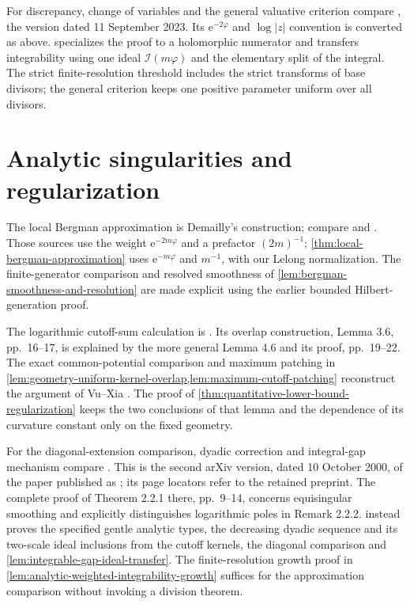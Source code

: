 For discrepancy, change of variables and the general valuative criterion compare \cite[Proposition 10.12, Theorem 10.13 and Corollary 10.18, pp.~44--46]{Bou23Notes}, the version dated 11 September 2023. Its $\mathrm e^{-2\varphi}$ and $\log|z|$ convention is converted as above.  specializes the proof to a holomorphic numerator and transfers integrability using one ideal $\mathcal I(m\varphi)$ and the elementary split of the integral. The strict finite-resolution threshold includes the strict transforms of base divisors; the general criterion keeps one positive parameter uniform over all divisors.

\section{Analytic singularities and regularization}
\label{sec:history-analytic-regularization}
The local Bergman approximation is Demailly's construction; compare \cite[Proposition 3.1 and its proof, pp.~13--14]{DemRegOnline} and \cite[Theorem 14.2, pp.~136--138]{DemAnalyticOnline}. Those sources use the weight $\mathrm e^{-2m\varphi}$ and a prefactor $(2m)^{-1}$; \cref{thm:local-bergman-approximation} uses $\mathrm e^{-m\varphi}$ and $m^{-1}$, with our Lelong normalization. The finite-generator comparison and resolved smoothness of \cref{lem:bergman-smoothness-and-resolution} are made explicit using the earlier bounded Hilbert-generation proof.

The logarithmic cutoff-sum calculation is \cite[Lemma 3.5, p.~15]{DemRegOnline}. Its overlap construction, Lemma 3.6, pp.~16--17, is explained by the more general Lemma 4.6 and its proof, pp.~19--22. The exact common-potential comparison and maximum patching in \cref{lem:geometry-uniform-kernel-overlap,lem:maximum-cutoff-patching} reconstruct the argument of Vu--Xia \cite[Lemmas \texttt{patching} and \texttt{regularization}]{VuXiaNakamaye}. The proof of \cref{thm:quantitative-lower-bound-regularization} keeps the two conclusions of that lemma and the dependence of its curvature constant only on the fixed geometry.

For the diagonal-extension comparison, dyadic correction and integral-gap mechanism compare \cite[Section 2.2, Steps 2--3, pp.~12--14]{DPS00Preprint}. This is the second arXiv version, dated 10 October 2000, of the paper published as \cite{DPS01}; its page locators refer to the retained preprint. The complete proof of Theorem 2.2.1 there, pp.~9--14, concerns equisingular smoothing and explicitly distinguishes logarithmic poles in Remark 2.2.2.  instead proves the specified gentle analytic types, the decreasing dyadic sequence and its two-scale ideal inclusions from the cutoff kernels, the diagonal comparison and \cref{lem:integrable-gap-ideal-transfer}. The finite-resolution growth proof in \cref{lem:analytic-weighted-integrability-growth} suffices for the approximation comparison without invoking a division theorem.

